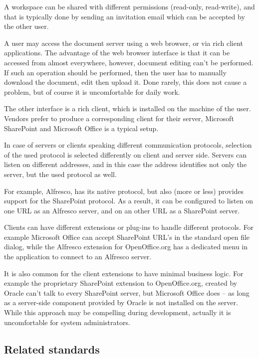 A workspace can be shared with different permissions
(read-only, read-write), and that is typically done by sending an invitation
email which can be accepted by the other user.

A user may access the document server using a web browser, or via rich client
applications. The advantage of the web browser interface is that it can be
accessed from almost everywhere, however, document editing can't be performed.
If such an operation should be performed, then the user has to manually download
the document, edit then upload it. Done rarely, this does not cause a
problem, but of course it is uncomfortable for daily work.

The other interface is a rich client, which is installed on the machine of the
user. Vendors prefer to produce a corresponding client for their server,
Microsoft SharePoint and Microsoft Office is a typical setup.

In case of servers or clients speaking different communication protocols,
selection of the used protocol is selected differently on client and server
side. Servers can listen on different addresses, and in this case the address
identifies not only the server, but the used protocol as well.

For example, Alfresco, has its native protocol, but also (more or less) provides
support for the SharePoint protocol. As a result, it can be configured to
listen on one URL as an Alfresco server, and on an other URL as a SharePoint
server.

Clients can have different extensions or plug-ins to handle different
protocols. For example Microsoft Office can accept SharePoint URL's in the
standard open file dialog, while the Alfresco extension for OpenOffice.org
has a dedicated menu in the application to connect to an Alfresco server.

It is also common for the client extensions to have minimal business logic. For
example the proprietary SharePoint extension to OpenOffice.org, created by
Oracle can't talk to every SharePoint server, but Microsoft Office does -- as
long as a server-side component provided by Oracle is not installed on the
server. While this approach may be compelling during development, actually it
is uncomfortable for system administrators.

\subsection{Related standards}

